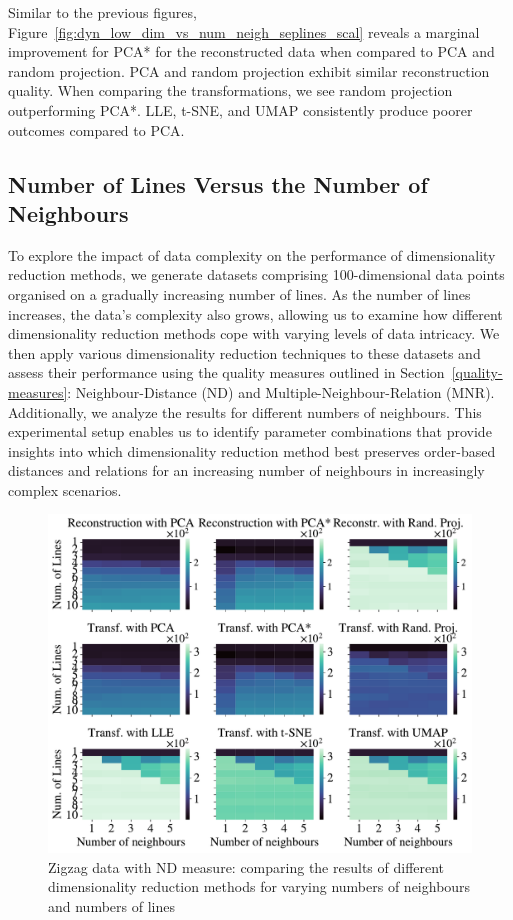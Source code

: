 \documentclass[pdftex,12pt,a4paper]{report}
\begin{document}
Similar to the previous figures, Figure~\ref{fig:dyn_low_dim_vs_num_neigh_seplines_scal} reveals a marginal improvement for PCA* for the reconstructed data when compared to PCA and random projection.
PCA and random projection exhibit similar reconstruction quality. 
When comparing the transformations, we see random projection outperforming PCA*.
LLE, t-SNE, and UMAP consistently produce poorer outcomes compared to PCA.

\FloatBarrier

\subsection{Number of Lines Versus the Number of Neighbours}
To explore the impact of data complexity on the performance of dimensionality reduction methods, we generate datasets comprising 100-dimensional data points organised on a gradually increasing number of lines.
As the number of lines increases, the data's complexity also grows, allowing us to examine how different dimensionality reduction methods cope with varying levels of data intricacy.
We then apply various dimensionality reduction techniques to these datasets and assess their performance using the quality measures outlined in Section~\ref{quality-measures}:  Neighbour-Distance (ND) and Multiple-Neighbour-Relation (MNR).
Additionally, we analyze the results for different numbers of neighbours.
This experimental setup enables us to identify parameter combinations that provide insights into which dimensionality reduction method best preserves order-based distances and relations for an increasing number of neighbours in increasingly complex scenarios.

\begin{figure}[htb!]
    \includegraphics[width=\textwidth]{./images/multiple_runs/zigzag/num_lines_vs_num_neigh/euclidean/all_methods_10runs_10lines_100points_5neighbours.pdf}
    \caption{Zigzag data with ND measure: comparing the results of different dimensionality reduction methods for varying numbers of neighbours and numbers of lines} \label{fig:num_neigh_vs_num_lines_zigzag}
\end{figure}
\end{document}
